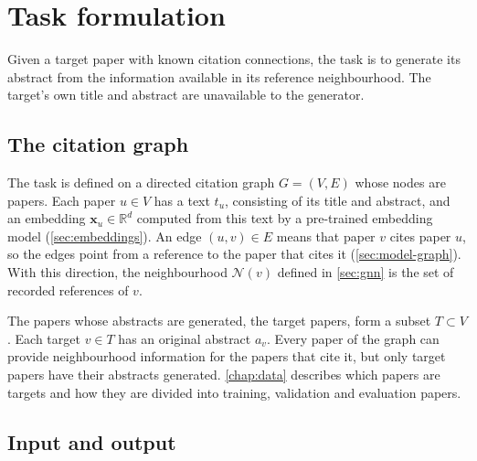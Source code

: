\chapter{Task formulation}
\label{chap:task}

Given a target paper with known citation connections, the task is to generate its abstract from the information available in its reference neighbourhood. The target's own title and abstract are unavailable to the generator.

\section{The citation graph}
\label{sec:task-graph}

The task is defined on a directed citation graph $G = (V, E)$ whose nodes are papers. Each paper $u \in V$ has a text $t_u$, consisting of its title and abstract, and an embedding $\mathbf{x}_u \in \mathbb{R}^d$ computed from this text by a pre-trained embedding model (\autoref{sec:embeddings}). An edge $(u, v) \in E$ means that paper $v$ cites paper $u$, so the edges point from a reference to the paper that cites it (\autoref{sec:model-graph}). With this direction, the neighbourhood $\mathcal{N}(v)$ defined in \autoref{sec:gnn} is the set of recorded references of $v$.

The papers whose abstracts are generated, the target papers, form a subset $T \subset V$. Each target $v \in T$ has an original abstract $a_v$. Every paper of the graph can provide neighbourhood information for the papers that cite it, but only target papers have their abstracts generated. \autoref{chap:data} describes which papers are targets and how they are divided into training, validation and evaluation papers.

\section{Input and output}
\label{sec:task-io}

